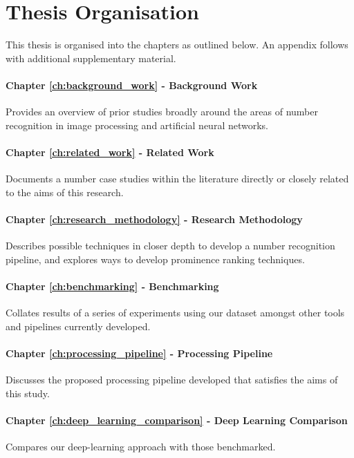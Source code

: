 \section{Thesis Organisation}

This thesis is organised into the chapters as outlined below. An appendix follows with additional supplementary material.

\paragraph{Chapter \ref{ch:background_work} - Background Work} Provides an overview of prior studies broadly around the areas of number recognition in image processing and artificial neural networks.

\paragraph{Chapter \ref{ch:related_work} - Related Work} Documents a number case studies within the literature directly or closely related to the aims of this research.

\paragraph{Chapter \ref{ch:research_methodology} - Research Methodology} Describes possible techniques in closer depth to develop a number recognition pipeline, and explores ways to develop prominence ranking techniques.

\paragraph{Chapter \ref{ch:benchmarking} - Benchmarking} Collates results of a series of experiments using our dataset amongst other tools and pipelines currently developed.

\paragraph{Chapter \ref{ch:processing_pipeline} - Processing Pipeline} Discusses the proposed processing pipeline developed that satisfies the aims of this study.

\paragraph{Chapter \ref{ch:deep_learning_comparison} - Deep Learning Comparison} Compares our deep-learning approach with those benchmarked.


